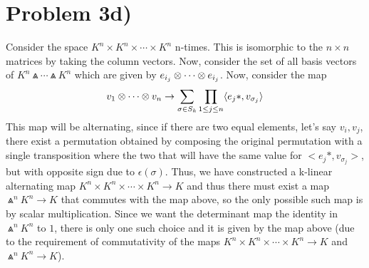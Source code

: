 \section*{Problem 3d)}
Consider the space $K^n \times K^n \times \cdots \times K^n$ n-times. This is isomorphic to the $n\times n$ matrices by taking the column vectors. Now, consider the set of all basis vectors of $K^n \Wedge \cdots \Wedge K^n$ which are given by $e_{i_j} \otimes \cdots \otimes e_{i_j}$. Now, consider the map
\[ v_1\otimes \cdots \otimes v_n \to \sum_{\sigma \in S_k} \prod_{1\leq j \leq n} \langle e_j*,v_{\sigma_j} \rangle \]
This map will be alternating, since if there are two equal elements, let's say $v_i, v_j$, there exist a permutation obtained by composing the original permutation with a single transposition where the two that will have the same value for $<e_j*,v_{\sigma_j}>$, but with opposite sign due to $\epsilon(\sigma)$. Thus, we have constructed a k-linear alternating map $K^n \times K^n \times \cdots \times K^n \to K$ and thus there must exist a map $\Wedge^n K^n \to K$ that commutes with the map above, so the only possible such map is by scalar multiplication. Since we want the determinant map the identity in $\Wedge^n K^n$ to $1$, there is only one such choice and it is given by the map above (due to the requirement of commutativity of the maps $K^n \times K^n \times \cdots \times K^n \to K$ and $\Wedge^n K^n\to K$).

